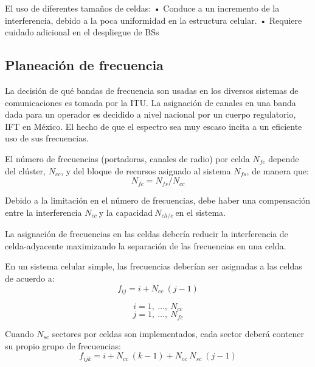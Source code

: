 El uso de diferentes tamaños de celdas:\newline
•	Conduce a un incremento de la interferencia, debido a la poca uniformidad en la estructura celular.\newline
•	Requiere cuidado adicional en el despliegue de BSs

\subsection{Planeación de frecuencia}
La decisión de qué bandas de frecuencia son usadas en los diversos sistemas de comunicaciones es tomada por la ITU. La asignación de canales en una banda dada para un operador es decidido a nivel nacional por un cuerpo regulatorio, IFT en México. El hecho de que el espectro sea muy escaso incita a un eficiente uso de sus frecuencias.\newline

El número de frecuencias (portadoras, canales de radio) por celda $N_{fc}$ depende del clúster, $N_{cc}$, y del bloque de recursos asignado al sistema $N_{fs}$, de manera que:
\begin{equation}
    N_{fc}={N_{fs}}/{N_{cc}}
    \label{eqn:Nfc}
\end{equation}

Debido a la limitación en el número de frecuencias, debe haber una compensación entre la interferencia $N_{cc}\ $y la capacidad$\ N_{ch/c}\ $en el sistema.\newline

La asignación de frecuencias en las celdas debería reducir la interferencia de celda-adyacente maximizando la separación de las frecuencias en una celda.\newline

En un sistema celular simple, las frecuencias deberían ser asignadas a las celdas de acuerdo a:\newline
\begin{equation}
    f_{ij}=i+N_{cc}\ (j-1)
    \label{eqn:fij}
\end{equation}

\[i=1,\ \dots ,\ N_{cc}\] 
\[j=1,\ \dots ,\ N_{fc}\] 

Cuando $N_{sc}$ sectores por celdas son implementados, cada sector deberá contener su propio grupo de frecuencias:\newline
\begin{equation}
    f_{ijk}=i+N_{cc}\ \left(k-1\right)+N_{cc}\ N_{sc}\ (j-1)
    \label{eqn:fijk}
\end{equation}


